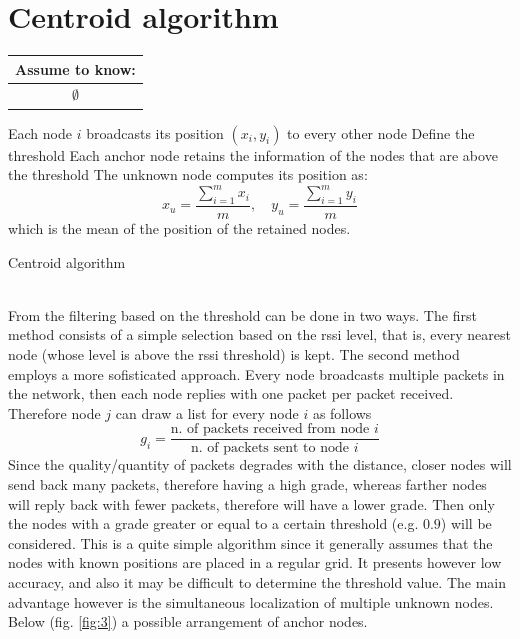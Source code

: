 \documentclass[12pt]{report}
\begin{document}
\section{Centroid algorithm}
\begin{center}
    \begin{tabular}{ |c| } 
    \hline
    \multicolumn{1}{|c|}{ \textbf{Assume to know:} } \\
    \hline
    $\emptyset$\\
    \hline
    \end{tabular}
\end{center}
\begin{algorithm}[H]
\SetAlgoLined
{}
 Each node $i$ broadcasts its position $(x_i,y_i)$ to every other node\;
 Define the threshold\;
 Each anchor node retains the information of the nodes that are above the threshold\;
 The unknown node computes its position as:
 \begin{equation}
     x_u=\frac{\sum_{i=1}^mx_i}{m},\quad y_u=\frac{\sum_{i=1}^my_i}{m}
 \end{equation}
which is the mean of the position of the retained nodes.
 \caption{Centroid algorithm}
\end{algorithm}
\noindent\\From \cite{878533} the filtering based on the threshold can be done in two ways. The first method consists of a simple selection based on the rssi level, that is, every nearest node (whose level is above the rssi threshold) is kept. The second method employs a more sofisticated approach. Every node broadcasts multiple packets in the network, then each node replies with one packet per packet received. Therefore node $j$ can draw a list for every node $i$ as follows 
\begin{equation}
    g_i = \frac{\text{n. of packets received from node $i$}}{\text{n. of packets sent to node $i$}}
\end{equation}
Since the quality/quantity of packets degrades with the distance, closer nodes will send back many packets, therefore having a high grade, whereas farther nodes will reply back with fewer packets, therefore will have a lower grade. Then only the nodes with a grade greater or equal to a certain threshold (e.g. $0.9$) will be considered. This is a quite simple algorithm since it generally assumes that the nodes with known positions are placed in a regular grid. It presents however low accuracy, and also it may be difficult to determine the threshold value. The main advantage however is the simultaneous localization of multiple unknown nodes. Below (fig. \ref{fig:3}) a possible arrangement of anchor nodes.
\end{document}
